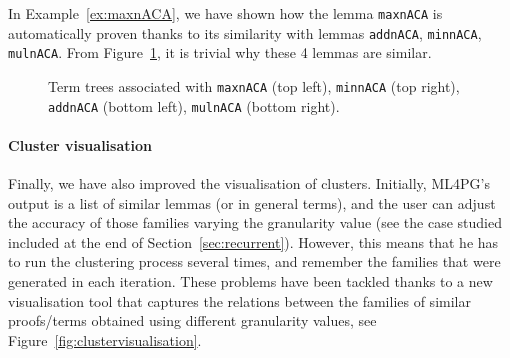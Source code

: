 \begin{example}
 In Example~\ref{ex:maxnACA}, we have shown how the lemma \lstinline?maxnACA? is automatically proven thanks to its similarity with lemmas \lstinline?addnACA?, \lstinline?minnACA?, \lstinline?mulnACA?. From Figure~\ref{fig:treevisualisation}, it is trivial why these 4 lemmas are similar.

 
 

\begin{figure}
\centering
{}
\caption{Term trees associated with \texttt{maxnACA} (top left), \texttt{minnACA} (top right), \texttt{addnACA} (bottom left), \texttt{mulnACA} (bottom right).}\label{fig:treevisualisation} 
\end{figure} 
 
 \end{example}

 
\paragraph{Cluster visualisation}

Finally, we have also improved the visualisation of clusters. Initially, ML4PG's output is a list of similar lemmas (or in general terms), and the user can adjust the accuracy of those families varying the granularity value (see the case studied included at the end of Section~\ref{sec:recurrent}). However, this means that he has to run the clustering process several times, and remember the families that were generated in each iteration. These problems have been tackled thanks to a new visualisation tool that captures the relations between the families of similar proofs/terms obtained using different granularity values, see Figure~\ref{fig:clustervisualisation}.





